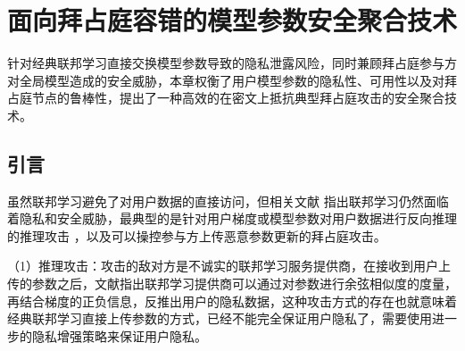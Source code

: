 \chapter{面向拜占庭容错的模型参数安全聚合技术}\label{pbfl}
针对经典联邦学习直接交换模型参数导致的隐私泄露风险，同时兼顾拜占庭参与方对全局模型造成的安全威胁，本章权衡了用户模型参数的隐私性、可用性以及对拜占庭节点的鲁棒性，提出了一种高效的在密文上抵抗典型拜占庭攻击的安全聚合技术。

\section{引言}

虽然联邦学习避免了对用户数据的直接访问，但相关文献\cite{kairouz2019advances, mothukuri2021survey, geiping2020inverting} 指出联邦学习仍然面临着隐私和安全威胁，最典型的是针对用户梯度或模型参数对用户数据进行反向推理的推理攻击 \cite{geiping2020inverting}，以及可以操控参与方上传恶意参数更新的拜占庭攻击\cite{kairouz2019advances, mothukuri2021survey}。

（1）推理攻击：攻击的敌对方是不诚实的联邦学习服务提供商，在接收到用户上传的参数之后，文献\cite{geiping2020inverting}指出联邦学习提供商可以通过对参数进行余弦相似度的度量，再结合梯度的正负信息，反推出用户的隐私数据，这种攻击方式的存在也就意味着经典联邦学习直接上传参数的方式，已经不能完全保证用户隐私了，需要使用进一步的隐私增强策略来保证用户隐私。%

